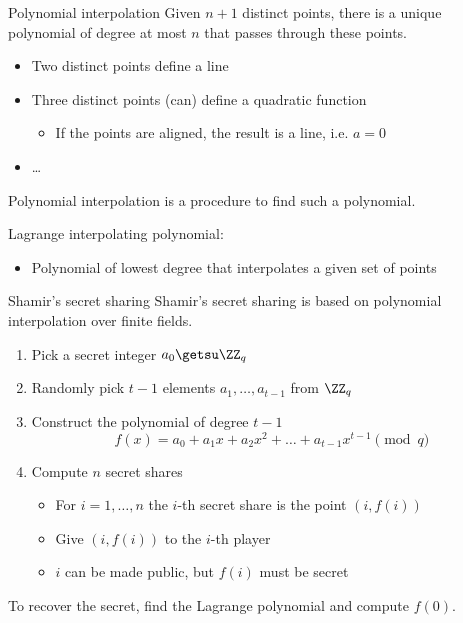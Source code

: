 \begin{frame}{Polynomial interpolation}
  Given $n+1$ distinct points, there is a unique polynomial of degree at most $n$ that passes through these points.
  \begin{itemize}[<+(1)->]
    \item Two distinct points define a line
    \item Three distinct points (can) define a quadratic function
    \begin{itemize}
      \item If the points are aligned, the result is a line, i.e. $a=0$
    \end{itemize}
    \item \dots
  \end{itemize}

  \vspace*{1em}

  \pause
  Polynomial interpolation is a procedure to find such a polynomial.

  \pause
  Lagrange interpolating polynomial:
  \begin{itemize}
    \item Polynomial of lowest degree that interpolates a given set of points
  \end{itemize}
\end{frame}

\begin{frame}{Shamir's secret sharing}
  Shamir's secret sharing is based on polynomial interpolation over finite fields.
  \begin{enumerate}[<+(1)->]
    \item Pick a secret integer $a_0 \getsu \ZZ_q$
    \item Randomly pick $t-1$ elements $a_1, \dots, a_{t-1}$ from $\ZZ_q$
    \item Construct the polynomial of degree $t-1$
    \[
      f(x) = a_0 + a_1 x + a_2 x^2 + \dots + a_{t-1} x^{t-1} \pmod{q}
    \]
    \item Compute $n$ secret shares
    \begin{itemize}
      \item For $i=1, \dots, n$ the $i$-th secret share is the point $(i, f(i))$
      \item Give $(i, f(i))$ to the $i$-th player
      \item $i$ can be made public, but $f(i)$ must be secret
    \end{itemize}
  \end{enumerate}

  \pause
  To recover the secret, find the Lagrange polynomial and compute $f(0)$.
\end{frame}

